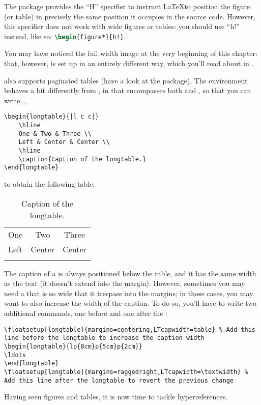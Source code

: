 The  package provides the \enquote{H} specifier to 
instruct \LaTeX to position the figure (or table) in precisely the same 
position it occupies in the source code. However, this specifier does 
not work with wide figures or tables: you should use \enquote{h!} 
instead, like so: \lstinline[language=tex]|\begin{figure*}[h!]|.

You may have noticed the full width image at the very beginning of this
chapter: that, however, is set up in an entirely different way, which
you'll read about in .

 also supports paginated tables (have a look at the 
 package). The 
 environment behaves a bit differently from 
, in that  encompasses both 
 and , so that you can write, 
\eg,

\begin{lstlisting}[caption=Example of a longtable]
\begin{longtable}{|l c c|}
    \hline
    One & Two & Three \\
    Left & Center & Center \\
    \hline
    \caption{Caption of the longtable.}
\end{longtable}
\end{lstlisting}

to obtain the following table:
\begin{longtable}{|l c c|}
    \hline
    One & Two & Three \\
    Left & Center & Center \\
    \hline
    \caption{Caption of the longtable.}
\end{longtable}

The caption of a  is always positioned below the 
table, and it has the same width as the text (it doesn't extend into the 
margin). However, sometimes you may need a  that 
is so wide that it trespass into the margins; in those cases, you may 
want to also increase the width of the caption. To do so, you'll have to 
write two additional commands, one before and one after the 
:

\begin{lstlisting}[caption=Increasing the width of the caption of a \Environment{longtable}.]
\floatsetup[longtable]{margins=centering,LTcapwidth=table} % Add this line before the longtable to increase the caption width
\begin{longtable}{lp{8cm}p{5cm}p{2cm}}
\ldots
\end{longtable}
\floatsetup[longtable]{margins=raggedright,LTcapwidth=\textwidth} % Add this line after the longtable to revert the previous change
\end{lstlisting}

Having seen figures and tables, it is now time to tackle 
hyperreferences.
